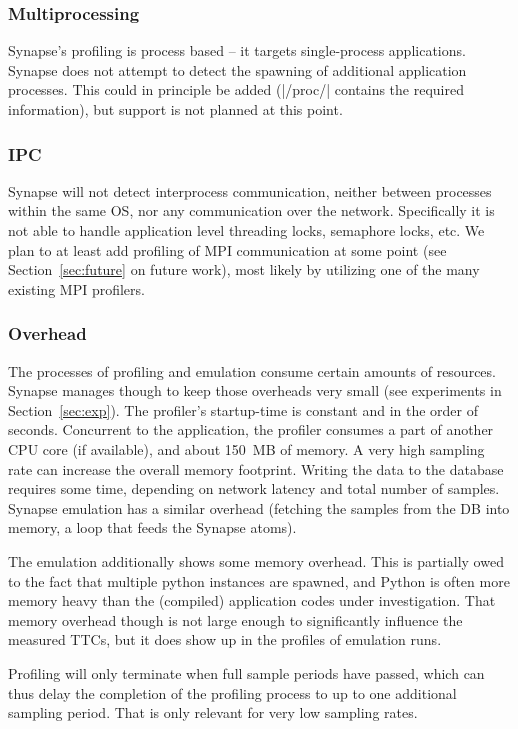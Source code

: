 \documentclass[10pt, conference, compsocconf]{IEEEtran}
\newcommand{\synapse}{Synapse\xspace}
\begin{document}
 \subsubsection{Multiprocessing}  \synapse's profiling is process
 based -- it targets single-process applications.  \synapse does not
 attempt to detect the spawning of additional application processes.
 This could in principle be added (|/proc/| contains the required
 information), but support is not planned at this point.

 \subsubsection{IPC}  \synapse will not detect interprocess
 communication, neither between processes within the same OS, nor any
 communication over the network.  Specifically it is not able to
 handle application level threading locks, semaphore locks, etc.  We
 plan to at least add profiling of MPI communication at some point (see
 Section~\ref{sec:future} on future work), most likely by utilizing
 one of the many existing MPI profilers.

 \subsubsection{Overhead}  The processes of profiling and emulation
 consume certain amounts of resources.  \synapse manages though to
 keep those overheads very small (see experiments in
 Section~\ref{sec:exp}).
 The profiler's startup-time is
 constant and in the order of  seconds.  Concurrent to the
 application, the profiler consumes a part of another CPU core (if
 available), and about 150~MB of memory.  A very high sampling rate
 can increase the overall memory footprint.  Writing the data to
 the database requires some time, depending on network latency and
 total number of samples.
 \synapse emulation has a similar overhead (fetching the samples from
 the DB into memory, a loop that feeds the \synapse atoms).  

 The emulation additionally shows some memory overhead.  This is
 partially owed to the fact that multiple python instances are
 spawned, and Python is often more memory heavy than the (compiled)
 application codes under investigation.  That memory overhead though
 is not large enough to significantly influence the measured TTCs, but
 it does show up in the profiles of emulation runs.

 Profiling will only terminate when full sample periods have passed,
 which can thus delay the completion of the profiling process to up to
 one additional sampling period.  That is only relevant for very low
 sampling rates.
\end{document}
